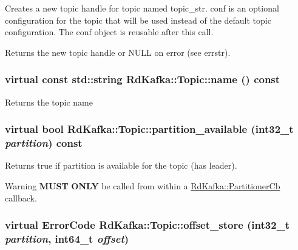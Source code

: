 Creates a new topic handle for topic named {\ttfamily topic\_\-str}. {\ttfamily conf} is an optional configuration for the topic that will be used instead of the default topic configuration. The {\ttfamily conf} object is reusable after this call.

\begin{DoxyReturn}{Returns}
the new topic handle or NULL on error (see {\ttfamily errstr}). 
\end{DoxyReturn}
\hypertarget{classRdKafka_1_1Topic_af61ec8b3c384a8de5a12f804e771c63d}{
\subsubsection[{name}]{\setlength{\rightskip}{0pt plus 5cm}virtual const std::string RdKafka::Topic::name () const}}
\label{classRdKafka_1_1Topic_af61ec8b3c384a8de5a12f804e771c63d}
\begin{DoxyReturn}{Returns}
the topic name 
\end{DoxyReturn}
\hypertarget{classRdKafka_1_1Topic_a8e2f4ce86845398312d319001462577c}{
\subsubsection[{partition\_\-available}]{\setlength{\rightskip}{0pt plus 5cm}virtual bool RdKafka::Topic::partition\_\-available (int32\_\-t {\em partition}) const}}
\label{classRdKafka_1_1Topic_a8e2f4ce86845398312d319001462577c}
\begin{DoxyReturn}{Returns}
true if {\ttfamily partition} is available for the topic (has leader). 
\end{DoxyReturn}
\begin{DoxyWarning}{Warning}
{\bfseries MUST} {\bfseries ONLY} be called from within a \hyperlink{classRdKafka_1_1PartitionerCb}{RdKafka::PartitionerCb} callback. 
\end{DoxyWarning}
\hypertarget{classRdKafka_1_1Topic_a218a291c89f5d4c311bec3c2b2bd8056}{
\subsubsection[{offset\_\-store}]{\setlength{\rightskip}{0pt plus 5cm}virtual ErrorCode RdKafka::Topic::offset\_\-store (int32\_\-t {\em partition}, \/  int64\_\-t {\em offset})}}
\label{classRdKafka_1_1Topic_a218a291c89f5d4c311bec3c2b2bd8056}


